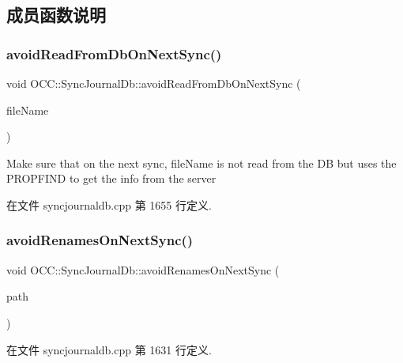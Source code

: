 \subsection{成员函数说明}
\mbox{\label{class_o_c_c_1_1_sync_journal_db_ad4c2934c23bd1a1a66bb41cb6d928b95}} 
\subsubsection{\texorpdfstring{avoid\+Read\+From\+Db\+On\+Next\+Sync()}{avoidReadFromDbOnNextSync()}}
{\footnotesize\ttfamily void O\+C\+C\+::\+Sync\+Journal\+Db\+::avoid\+Read\+From\+Db\+On\+Next\+Sync (\begin{DoxyParamCaption}\item[{const Q\+String \&}]{file\+Name }\end{DoxyParamCaption})}

Make sure that on the next sync, file\+Name is not read from the DB but uses the P\+R\+O\+P\+F\+I\+ND to get the info from the server 

在文件 syncjournaldb.\+cpp 第 1655 行定义.

\mbox{\label{class_o_c_c_1_1_sync_journal_db_a8d5610b0467f17341f81071495d4721e}} 
\subsubsection{\texorpdfstring{avoid\+Renames\+On\+Next\+Sync()}{avoidRenamesOnNextSync()}}
{\footnotesize\ttfamily void O\+C\+C\+::\+Sync\+Journal\+Db\+::avoid\+Renames\+On\+Next\+Sync (\begin{DoxyParamCaption}\item[{const Q\+String \&}]{path }\end{DoxyParamCaption})}



在文件 syncjournaldb.\+cpp 第 1631 行定义.

